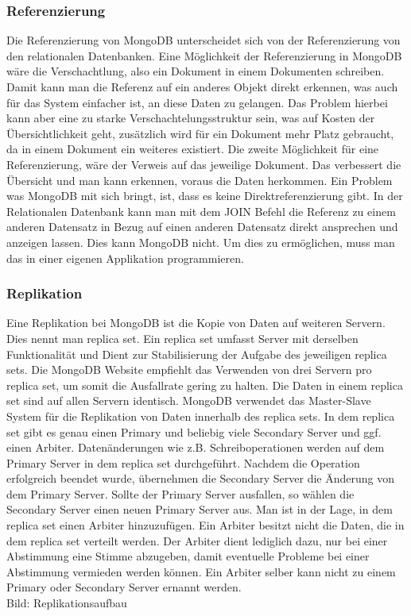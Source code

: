 \subsubsection{Referenzierung}
Die Referenzierung von MongoDB unterscheidet sich von der Referenzierung von den relationalen Datenbanken. Eine Möglichkeit der Referenzierung in MongoDB wäre die Verschachtlung, also ein Dokument in einem Dokumenten schreiben. Damit kann man die Referenz auf ein anderes Objekt direkt erkennen, was auch für das System einfacher ist, an diese Daten zu gelangen. Das Problem hierbei kann aber eine zu starke Verschachtelungsstruktur sein, was auf Kosten der Übersichtlichkeit geht, zusätzlich wird für ein Dokument mehr Platz gebraucht, da in einem Dokument ein weiteres existiert. Die zweite Möglichkeit für eine Referenzierung, wäre der Verweis auf das jeweilige Dokument. Das verbessert die Übersicht und man kann erkennen, voraus die Daten herkommen. Ein Problem was MongoDB mit sich bringt, ist, dass es keine Direktreferenzierung gibt. In der Relationalen Datenbank kann man mit dem JOIN Befehl die Referenz zu einem anderen Datensatz in Bezug auf einen anderen Datensatz direkt ansprechen und anzeigen lassen. Dies kann MongoDB nicht. Um dies zu ermöglichen, muss man das in einer eigenen Applikation programmieren. 
\subsubsection{Replikation}
Eine Replikation bei MongoDB ist die Kopie von Daten auf weiteren Servern. Dies nennt man replica set. Ein replica set umfasst Server mit derselben Funktionalität und Dient zur Stabilisierung der Aufgabe des jeweiligen replica sets. Die MongoDB Website empfiehlt das Verwenden von drei Servern pro replica set, um somit die Ausfallrate gering zu halten. Die Daten in einem replica set sind auf allen Servern identisch. MongoDB verwendet das Master-Slave System für die Replikation von Daten innerhalb des replica sets. In dem replica set gibt es genau einen Primary und beliebig viele Secondary Server und ggf. einen Arbiter. Datenänderungen wie z.B. Schreiboperationen werden auf dem Primary Server in dem replica set durchgeführt. Nachdem die Operation erfolgreich beendet wurde, übernehmen die Secondary Server die Änderung von dem Primary Server. Sollte der Primary Server ausfallen, so wählen die Secondary Server einen neuen Primary Server aus. Man ist in der Lage, in dem replica set einen Arbiter hinzuzufügen. Ein Arbiter besitzt nicht die Daten, die in dem replica set verteilt werden. Der Arbiter dient lediglich dazu, nur bei einer Abstimmung eine Stimme abzugeben, damit eventuelle Probleme bei einer Abstimmung vermieden werden können. Ein Arbiter selber kann nicht zu einem Primary oder Secondary Server ernannt werden.
\\
Bild: Replikationsaufbau
\\
